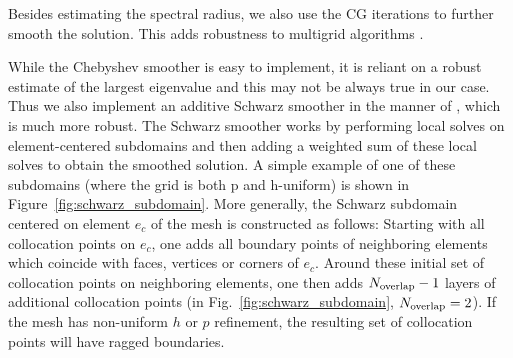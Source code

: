 Besides estimating the spectral radius, we also use the CG iterations to further smooth the
solution. This adds robustness to multigrid algorithms \cite{elman2001multigrid}.

While the Chebyshev smoother is easy to implement, it is reliant on a robust estimate of the largest eigenvalue and this may not be always true in our case. Thus we also implement an additive Schwarz smoother in the manner of \cite{stiller2017robust}, which is much more robust. The Schwarz smoother works by performing local solves on element-centered subdomains and then adding a weighted sum of these local solves to obtain the smoothed solution. A simple example of one of these subdomains (where the grid is both p and h-uniform) is shown in Figure~\ref{fig:schwarz_subdomain}.
More generally, the Schwarz subdomain centered on element $e_c$
  of the mesh is constructed as follows: Starting with all collocation
  points on $e_c$, one adds all boundary points of neighboring elements
  which coincide with faces, vertices or corners of $e_c$.  Around these
  initial set of collocation points on neighboring elements, one then
  adds $N_{\rm overlap}-1$ layers of additional collocation points (in Fig.~\ref{fig:schwarz_subdomain}, $N_{\rm overlap}=2$).  If the mesh has non-uniform $h$ or $p$ refinement, the resulting set of collocation points will have ragged boundaries.

